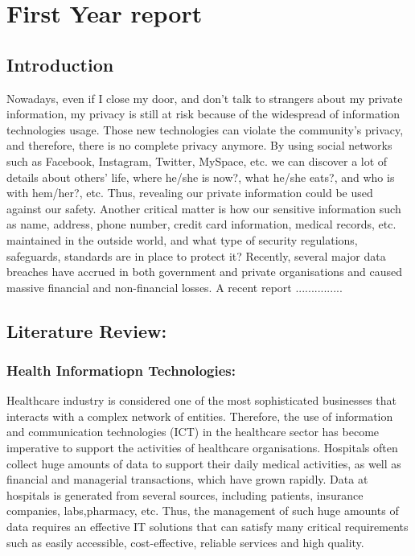 

\chapter{First Year report}
\label{c:First Year}



\section{Introduction}

Nowadays, even if I close my door, and don’t talk to strangers about my private information, my privacy is still at risk because of the widespread of information technologies usage. Those new technologies can violate the community’s privacy, and therefore, there is no complete privacy anymore. By using social networks such as Facebook, Instagram, Twitter, MySpace, etc. we can discover a lot of details about others’ life, where he/she is now?, what he/she eats?, and who is with hem/her?, etc. Thus, revealing our private information could be used against our safety. Another critical matter is how our sensitive information such as name, address, phone number, credit card information, medical records, etc. maintained in the outside world, and what type of security regulations, safeguards, standards are in place to protect it? Recently, several major data breaches have accrued in both government and private organisations and caused massive financial and non-financial losses. A recent report ...............

\section{Literature Review:}
\subsection{Health Informatiopn Technologies:}


Healthcare industry is considered one of the most sophisticated businesses that interacts with a complex network of entities. Therefore, the use of information and communication technologies (ICT) in the healthcare sector has become imperative to support the activities of healthcare organisations. Hospitals often collect huge amounts of data to support their daily medical activities, as well as financial and managerial transactions, which have grown rapidly. Data at hospitals is generated from several sources, including patients, insurance companies, labs,pharmacy, etc. Thus, the management of such huge amounts of data requires an effective IT solutions that can satisfy many critical requirements such as easily accessible, cost-effective, reliable services and high quality.

